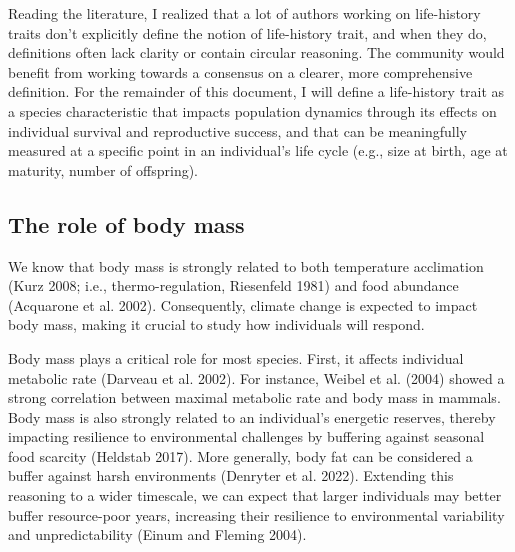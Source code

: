 \documentclass[
  12pt,
  letterpaper,
]{scrartcl}
\begin{document}
Reading the literature, I realized that a lot of authors working on
life-history traits don't explicitly define the notion of life-history
trait, and when they do, definitions often lack clarity or contain
circular reasoning. The community would benefit from working towards a
consensus on a clearer, more comprehensive definition. For the remainder
of this document, I will define a life-history trait as a species
characteristic that impacts population dynamics through its effects on
individual survival and reproductive success, and that can be
meaningfully measured at a specific point in an individual's life cycle
(e.g., size at birth, age at maturity, number of offspring).

\subsection{The role of body mass}\label{the-role-of-body-mass}

We know that body mass is strongly related to both temperature
acclimation (Kurz 2008; i.e., thermo-regulation, Riesenfeld 1981) and
food abundance (Acquarone et al. 2002). Consequently, climate change is
expected to impact body mass, making it crucial to study how individuals
will respond.

Body mass plays a critical role for most species. First, it affects
individual metabolic rate (Darveau et al. 2002). For instance, Weibel et
al. (2004) showed a strong correlation between maximal metabolic rate
and body mass in mammals. Body mass is also strongly related to an
individual's energetic reserves, thereby impacting resilience to
environmental challenges by buffering against seasonal food scarcity
(Heldstab 2017). More generally, body fat can be considered a buffer
against harsh environments (Denryter et al. 2022). Extending this
reasoning to a wider timescale, we can expect that larger individuals
may better buffer resource-poor years, increasing their resilience to
environmental variability and unpredictability (Einum and Fleming 2004).
\end{document}
